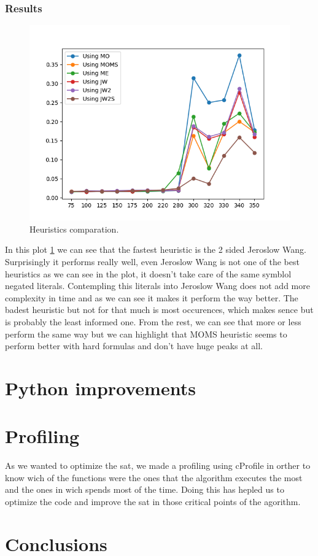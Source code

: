 \documentclass{article}
\begin{document}
\subsubsection{Results}
\begin{figure}[H]
  \includegraphics[width=\linewidth]{../utils/plots/heuristics.png}
  \caption{Heuristics comparation.}
  \label{fig:heu}
\end{figure}
In this plot \ref{fig:heu} we can see that the fastest heuristic is the 2 sided Jeroslow Wang. Surprisingly it performs really well, even Jeroslow Wang is not one of the best heuristics as we can see in the plot, it doesn't take care of the same symblol negated literals. Contempling this literals into Jeroslow Wang does not add more complexity in time and as we can see it makes it perform the way better.
The badest heuristic but not for that much is most occurences, which makes sence but is probably the least informed one. 
From the rest, we can see that more or less perform the same way but we can highlight that MOMS heuristic seems to perform better with hard formulas and don't have huge peaks at all.
\section{Python improvements}
%
\section{Profiling}
%
As we wanted to optimize the sat, we made a profiling using cProfile in orther to know wich of the functions were the ones that the algorithm executes the most and the ones in wich spends most of the time. Doing this has hepled us to optimize the code and improve the sat in those critical points of the agorithm.
\section{Conclusions}
\end{document}
